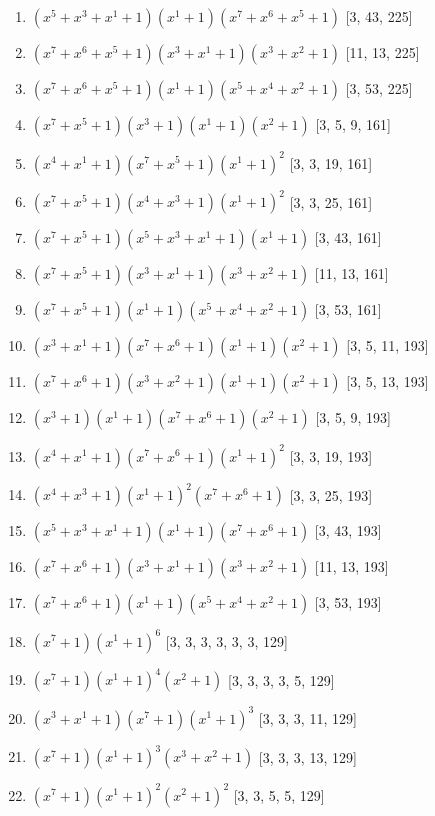 \documentclass[10pt,twocolumn]{article}
\begin{document}
\begin{enumerate}
\item $(x^{5} + x^{3} + x^{1} + 1)(x^{1} + 1)(x^{7} + x^{6} + x^{5} + 1)$  [3, 43, 225]
\item $(x^{7} + x^{6} + x^{5} + 1)(x^{3} + x^{1} + 1)(x^{3} + x^{2} + 1)$  [11, 13, 225]
\item $(x^{7} + x^{6} + x^{5} + 1)(x^{1} + 1)(x^{5} + x^{4} + x^{2} + 1)$  [3, 53, 225]
\item $(x^{7} + x^{5} + 1)(x^{3} + 1)(x^{1} + 1)(x^{2} + 1)$  [3, 5, 9, 161]
\item $(x^{4} + x^{1} + 1)(x^{7} + x^{5} + 1)(x^{1} + 1)^{2}$  [3, 3, 19, 161]
\item $(x^{7} + x^{5} + 1)(x^{4} + x^{3} + 1)(x^{1} + 1)^{2}$  [3, 3, 25, 161]
\item $(x^{7} + x^{5} + 1)(x^{5} + x^{3} + x^{1} + 1)(x^{1} + 1)$  [3, 43, 161]
\item $(x^{7} + x^{5} + 1)(x^{3} + x^{1} + 1)(x^{3} + x^{2} + 1)$  [11, 13, 161]
\item $(x^{7} + x^{5} + 1)(x^{1} + 1)(x^{5} + x^{4} + x^{2} + 1)$  [3, 53, 161]
\item $(x^{3} + x^{1} + 1)(x^{7} + x^{6} + 1)(x^{1} + 1)(x^{2} + 1)$  [3, 5, 11, 193]
\item $(x^{7} + x^{6} + 1)(x^{3} + x^{2} + 1)(x^{1} + 1)(x^{2} + 1)$  [3, 5, 13, 193]
\item $(x^{3} + 1)(x^{1} + 1)(x^{7} + x^{6} + 1)(x^{2} + 1)$  [3, 5, 9, 193]
\item $(x^{4} + x^{1} + 1)(x^{7} + x^{6} + 1)(x^{1} + 1)^{2}$  [3, 3, 19, 193]
\item $(x^{4} + x^{3} + 1)(x^{1} + 1)^{2}(x^{7} + x^{6} + 1)$  [3, 3, 25, 193]
\item $(x^{5} + x^{3} + x^{1} + 1)(x^{1} + 1)(x^{7} + x^{6} + 1)$  [3, 43, 193]
\item $(x^{7} + x^{6} + 1)(x^{3} + x^{1} + 1)(x^{3} + x^{2} + 1)$  [11, 13, 193]
\item $(x^{7} + x^{6} + 1)(x^{1} + 1)(x^{5} + x^{4} + x^{2} + 1)$  [3, 53, 193]
\item $(x^{7} + 1)(x^{1} + 1)^{6}$  [3, 3, 3, 3, 3, 3, 129]
\item $(x^{7} + 1)(x^{1} + 1)^{4}(x^{2} + 1)$  [3, 3, 3, 3, 5, 129]
\item $(x^{3} + x^{1} + 1)(x^{7} + 1)(x^{1} + 1)^{3}$  [3, 3, 3, 11, 129]
\item $(x^{7} + 1)(x^{1} + 1)^{3}(x^{3} + x^{2} + 1)$  [3, 3, 3, 13, 129]
\item $(x^{7} + 1)(x^{1} + 1)^{2}(x^{2} + 1)^{2}$  [3, 3, 5, 5, 129]

\end{enumerate}
\end{document}
